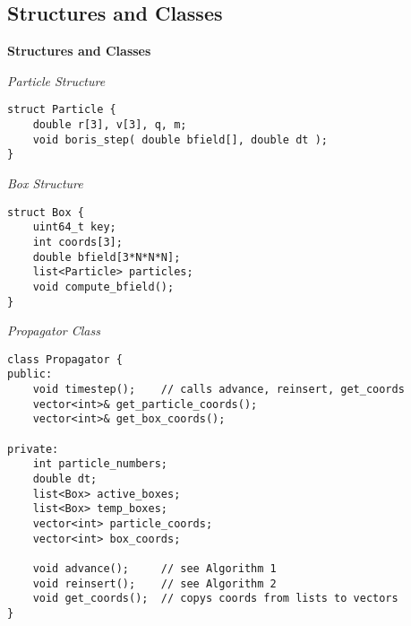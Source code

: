 \subsection{Structures and Classes}
\begin{frame}[fragile]
    \textbf{Structures and Classes}
    \medskip

    \textit{Particle Structure}
    \begin{verbatim}
struct Particle {
    double r[3], v[3], q, m;
    void boris_step( double bfield[], double dt );
}
    \end{verbatim}
    \medskip

    \textit{Box Structure}
    \begin{verbatim}
struct Box {
    uint64_t key;
    int coords[3];
    double bfield[3*N*N*N];
    list<Particle> particles;
    void compute_bfield();
}
    \end{verbatim}

\end{frame}


\begin{frame}[fragile]

    \textit{Propagator Class}
    \begin{verbatim}
class Propagator {
public:
    void timestep();    // calls advance, reinsert, get_coords
    vector<int>& get_particle_coords();
    vector<int>& get_box_coords();

private:
    int particle_numbers;
    double dt;
    list<Box> active_boxes;
    list<Box> temp_boxes;
    vector<int> particle_coords;
    vector<int> box_coords;

    void advance();     // see Algorithm 1
    void reinsert();    // see Algorithm 2
    void get_coords();  // copys coords from lists to vectors
}
    \end{verbatim}

\end{frame}

